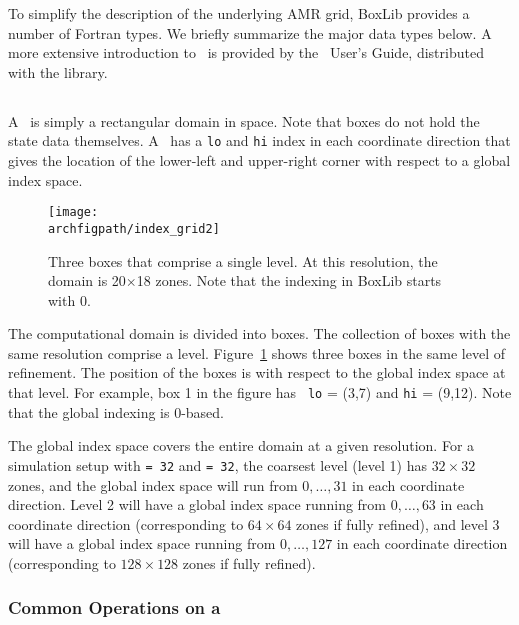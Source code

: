 To simplify the description of the underlying AMR grid, BoxLib
provides a number of Fortran types.  We briefly summarize the major
data types below.  A more extensive introduction to \boxlib\ is 
provided by the \boxlib\ User's Guide, distributed with the library.


\subsection{\boxtype}

A \boxtype\ is simply a rectangular domain in space.  Note that boxes
do not hold the state data themselves.  A \boxtype\ has a {\tt lo} 
and {\tt hi} index in each coordinate direction that gives the
location of the lower-left and upper-right corner with respect to
a global index space.  

\begin{figure}[t]
\centering
\texttt{[image: \\archfigpath/index\_grid2]}
\caption[Single-level grid structure]
{\label{fig:boxes} Three boxes that comprise a single level.  At this
  resolution, the domain is 20$\times$18 zones.  Note that the
  indexing in BoxLib starts with $0$.}
\end{figure}


The computational domain is divided into boxes.  The collection of
boxes with the same resolution comprise a level.
Figure~\ref{fig:boxes} shows three boxes in the same level of
refinement.  The position of the boxes is with respect to the global
index space at that level.  For example, box 1 in the figure has {\tt
  lo} = (3,7) and {\tt hi} = (9,12).  Note that the global indexing
is 0-based.

The global index space covers the entire domain at a given resolution.
For a simulation setup with  {\tt = 32} and  {\tt =
  32}, the coarsest level (level 1) has $32 \times 32$ zones, and the
global index space will run from $0, \ldots, 31$ in each coordinate
direction.  Level 2 will have a global index space running from $0,
\ldots, 63$ in each coordinate direction (corresponding to $64 \times
64$ zones if fully refined), and level 3 will have a global index
space running from $0, \ldots, 127$ in each coordinate direction
(corresponding to $128\times 128$ zones if fully refined).


\subsubsection{Common Operations on a \boxtype}

